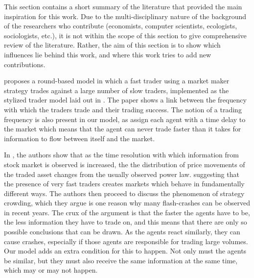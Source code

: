 This section contains a short summary of the literature that provided the main inspiration for this work. Due to the multi-disciplinary nature of the background of the researchers who contribute (economists, computer scientists, ecologists, sociologists, etc.), it is not within the scope of this section to give  comprehensive review of the literature. Rather, the aim of this section is to show which influences lie behind this work, and where this work tries to add new contributions.

\cite{chiwang2013investigating} proposes a round-based model in which a fast trader using a market maker strategy trades against a large number of slow traders, implemented as the stylized trader model laid out in \cite{chiarella2009impact}. The paper shows a link between the frequency with which the traders trade and their trading success. The notion of a trading frequency is also present in our model, as assign each agent with a time delay to the market which means that the agent can never trade faster than it takes for information to flow between itself and the market.

In \cite{johnson2012financial}, the authors show that as the time resolution with which information from stock market is observed is increased, the the distribution of price movements of the traded asset changes from the usually observed power law.  suggesting that the presence of very fast traders creates markets which behave in fundamentally different ways. The authors then proceed to discuss the phenomenon of strategy crowding, which they argue is one reason why many flash-crashes can be observed in recent years. The crux of the argument is that the faster the agents have to be, the less information they have to trade on, and this means that there are only so possible conclusions that can be drawn. As the agents react similarly, they can cause crashes, especially if those agents are responsible for trading large volumes. Our model adds an extra condition for this to happen. Not only must the agents be similar, but they must also receive the same information at the same time, which may or may not happen.

